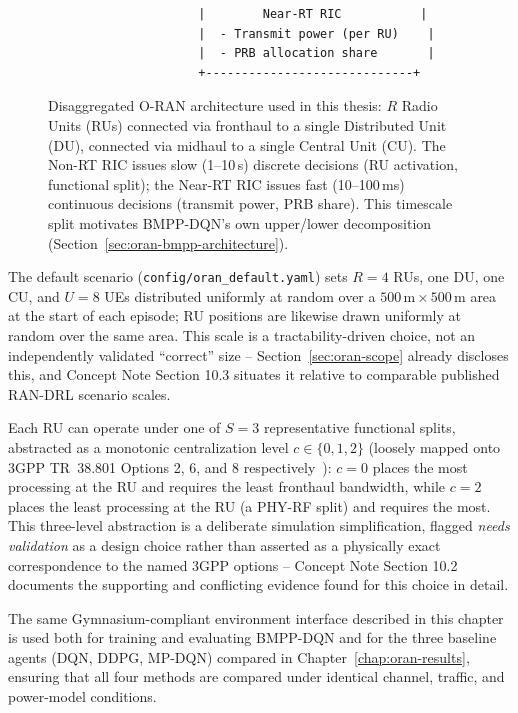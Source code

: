 \begin{figure}[htbp]
\begin{verbatim}
                     |        Near-RT RIC           |
                     |  - Transmit power (per RU)    |
                     |  - PRB allocation share       |
                     +-----------------------------+
\end{verbatim}
\caption{Disaggregated O-RAN architecture used in this thesis: $R$ Radio
  Units (RUs) connected via fronthaul to a single Distributed Unit (DU),
  connected via midhaul to a single Central Unit (CU). The Non-RT RIC
  issues slow (1--10\,s) discrete decisions (RU activation, functional
  split); the Near-RT RIC issues fast (10--100\,ms) continuous decisions
  (transmit power, PRB share). This timescale split motivates BMPP-DQN's
  own upper/lower decomposition (Section~\ref{sec:oran-bmpp-architecture}).}
\label{fig:oran-architecture}
\end{figure}

The default scenario (\texttt{config/oran\_default.yaml}) sets $R=4$ RUs,
one DU, one CU, and $U=8$ UEs distributed uniformly at random over a
$500\,\mathrm{m} \times 500\,\mathrm{m}$ area at the start of each episode;
RU positions are likewise drawn uniformly at random over the same area.
This scale is a tractability-driven choice, not an independently validated
``correct'' size -- Section~\ref{sec:oran-scope} already discloses this,
and Concept Note Section 10.3 situates it relative to comparable published
RAN-DRL scenario scales.

Each RU can operate under one of $S=3$ representative functional splits,
abstracted as a monotonic centralization level $c \in \{0, 1, 2\}$
(loosely mapped onto 3GPP TR~38.801 Options 2, 6, and 8
respectively~\cite{threegpp38801}): $c=0$ places the most processing at
the RU and requires the least fronthaul bandwidth, while $c=2$ places the
least processing at the RU (a PHY-RF split) and requires the most. This
three-level abstraction is a deliberate simulation simplification, flagged
\emph{needs validation} as a design choice rather than asserted as a
physically exact correspondence to the named 3GPP options -- Concept Note
Section 10.2 documents the supporting and conflicting evidence found for
this choice in detail.

The same Gymnasium-compliant environment interface described in this
chapter is used both for training and evaluating BMPP-DQN and for the
three baseline agents (DQN, DDPG, MP-DQN) compared in
Chapter~\ref{chap:oran-results}, ensuring that all four methods are
compared under identical channel, traffic, and power-model conditions.

